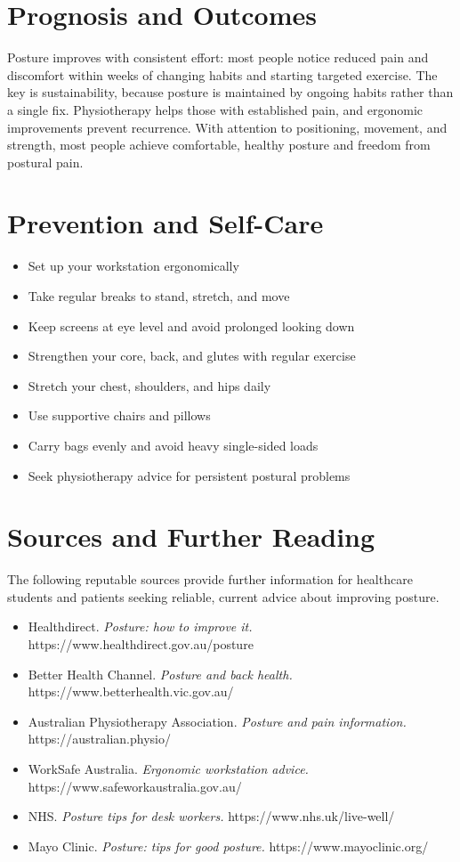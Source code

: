 \section*{Prognosis and Outcomes}
Posture improves with consistent effort: most people notice reduced pain and discomfort within weeks of changing habits and starting targeted exercise. The key is sustainability, because posture is maintained by ongoing habits rather than a single fix. Physiotherapy helps those with established pain, and ergonomic improvements prevent recurrence. With attention to positioning, movement, and strength, most people achieve comfortable, healthy posture and freedom from postural pain.

\section*{Prevention and Self-Care}
\begin{itemize}
    \item Set up your workstation ergonomically
    \item Take regular breaks to stand, stretch, and move
    \item Keep screens at eye level and avoid prolonged looking down
    \item Strengthen your core, back, and glutes with regular exercise
    \item Stretch your chest, shoulders, and hips daily
    \item Use supportive chairs and pillows
    \item Carry bags evenly and avoid heavy single-sided loads
    \item Seek physiotherapy advice for persistent postural problems
\end{itemize}

\section*{Sources and Further Reading}
The following reputable sources provide further information for healthcare students and patients seeking reliable, current advice about improving posture.

\begin{itemize}
    \item Healthdirect. \textit{Posture: how to improve it.} https://www.healthdirect.gov.au/posture
    \item Better Health Channel. \textit{Posture and back health.} https://www.betterhealth.vic.gov.au/
    \item Australian Physiotherapy Association. \textit{Posture and pain information.} https://australian.physio/
    \item WorkSafe Australia. \textit{Ergonomic workstation advice.} https://www.safeworkaustralia.gov.au/
    \item NHS. \textit{Posture tips for desk workers.} https://www.nhs.uk/live-well/
    \item Mayo Clinic. \textit{Posture: tips for good posture.} https://www.mayoclinic.org/
\end{itemize}
